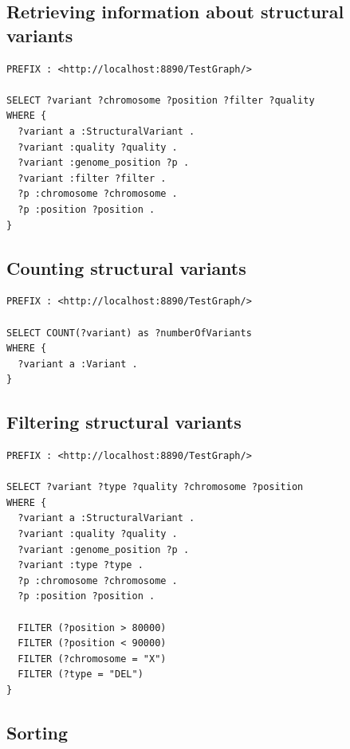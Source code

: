 \documentclass[11pt,a4paper,oneside]{book}
\begin{document}
\subsection{Retrieving information about structural variants}
\label{sec:sparqling-svs}

\begin{siderules}
\begin{verbatim}
PREFIX : <http://localhost:8890/TestGraph/>

SELECT ?variant ?chromosome ?position ?filter ?quality
WHERE {
  ?variant a :StructuralVariant .
  ?variant :quality ?quality .
  ?variant :genome_position ?p .
  ?variant :filter ?filter .
  ?p :chromosome ?chromosome .
  ?p :position ?position .
}
\end{verbatim}
\end{siderules}

\subsection{Counting structural variants}

\begin{siderules}
\begin{verbatim}
PREFIX : <http://localhost:8890/TestGraph/>

SELECT COUNT(?variant) as ?numberOfVariants
WHERE {
  ?variant a :Variant .
}
\end{verbatim}
\end{siderules}

\subsection{Filtering structural variants}

\begin{siderules}
\begin{verbatim}
PREFIX : <http://localhost:8890/TestGraph/>

SELECT ?variant ?type ?quality ?chromosome ?position
WHERE {
  ?variant a :StructuralVariant .
  ?variant :quality ?quality .
  ?variant :genome_position ?p .
  ?variant :type ?type .
  ?p :chromosome ?chromosome .
  ?p :position ?position .

  FILTER (?position > 80000)
  FILTER (?position < 90000)
  FILTER (?chromosome = "X")
  FILTER (?type = "DEL")
}
\end{verbatim}
\end{siderules}

\subsection{Sorting}
\end{document}
